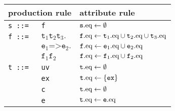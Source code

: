 \begin{figure}\centering
\small
\begin{tabular}{lll}
\hline
\multicolumn{2}{l}{production rule\hspace*{0.2\textwidth}} & attribute rule\\
  \hline
\texttt{s ::=}&\texttt{f}& $\texttt{s}.\text{eq} \leftarrow \emptyset$\\
\texttt{f ::= } &  $ \texttt{t}_1 \texttt{t}_2 \texttt{t}_3.$&   $ \texttt{f}.\text{eq} \leftarrow \texttt{t}_1.\text{eq}\cup \texttt{t}_2.\text{eq}\cup \texttt{t}_3.\text{eq}$ \\
    &  $\texttt{e}_1 \texttt{=>}  \texttt{e}_2.$& $\texttt{f}.\text{eq} \leftarrow \texttt{e}_1.\text{eq}\cup \texttt{e}_2.\text{eq}$ \\
    & $ \texttt{f}_1 \texttt{f}_2$ &                $\texttt{f}.\text{eq} \leftarrow \texttt{f}_1.\text{eq}\cup \texttt{f}_2.\text{eq}$ \\
\texttt{t ::=}& \texttt{uv}\hspace{0.07\textwidth} &                $\texttt{t}.\text{eq} \leftarrow\emptyset$\\
            & \texttt{ex} &               $\texttt{t}.\text{eq} \leftarrow \{\texttt{ex}\}$\\
      & \texttt{c} &               $\texttt{t}.\text{eq} \leftarrow\emptyset$\\
      & \texttt{e} &                $\texttt{t}.\text{eq} \leftarrow\texttt{e}.\text{eq} $\\

\end{tabular}
\end{figure}
